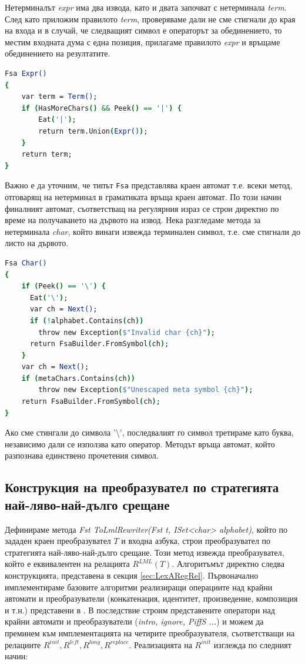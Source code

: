\documentclass[12pt, oneside]{article}
\theoremstyle{definition}
\begin{document}
Нетерминалът \emph{expr} има два извода, като и двата започват с нетерминала \emph{term}. След като приложим правилото \emph{term}, проверяваме дали не сме стигнали до края на входа и в случай, че следващият символ е операторът за обединението, то местим входната дума с една позиция, прилагаме правилото \emph{expr} и връщаме обединението на резултатите.

\begin{lstlisting}[language=csh]
Fsa Expr() 
{
    var term = Term();
    if (HasMoreChars() && Peek() == '|') {
        Eat('|');
        return term.Union(Expr());
    }
    return term;
}
\end{lstlisting}

Важно е да уточним, че типът \verb/Fsa/ представлява краен автомат т.е. всеки метод, отговарящ на нетерминал в граматиката връща краен автомат. По този начин финалният автомат, съответстващ на регулярния израз се строи директно по време на получаването на дървото на извод. Нека разгледаме метода за нетерминала \emph{char}, който винаги извежда терминален символ, т.е. сме стигнали до листо на дървото.

\begin{lstlisting}[language=csh]
Fsa Char() 
{
    if (Peek() == '\') {
      Eat('\');
      var ch = Next();
      if (!alphabet.Contains(ch))
        throw new Exception($"Invalid char {ch}");
      return FsaBuilder.FromSymbol(ch);
    }	
    var ch = Next();
    if (metaChars.Contains(ch))
        throw new Exception($"Unescaped meta symbol {ch}");
    return FsaBuilder.FromSymbol(ch);
}
\end{lstlisting}

Ако сме стингали до символа '\textbackslash', последвалият го символ третираме като буква, независимо дали се използва като оператор. Методът връща автомат, който разпознава единствено прочетения символ.

\subsection{Конструкция на преобразувател по стратегията най-ляво-най-дълго срещане}

Дефинираме метода \emph{Fst ToLmlRewriter(Fst t, ISet<char> alphabet)}, който по зададен краен преобразувател \(T\) и входна азбука, строи преобразувател по стратегията най-ляво-най-дълго срещане. Този метод извежда преобразувател, който е еквивалентен на релацията \( R^{LML}(T) \). Алгоритъмът директно следва конструкцията, представена в секция \ref{sec:LexARegRel}. Първоначално имплементираме базовите алгоритми реализиращи операциите над крайни автомати и преобразуватели (конкатенация, идентитет, произведение, композиция и т.н.) представени в \cite{Mihov:2018}. В последствие строим представените оператори над крайни автомати и преобразуватели (\emph{intro, ignore, PiffS ...}) и можем да преминем към имплементацията на четирите преобразувателя, съответстващи на релациите \( R^{init}, R^{left}, R^{long}, R^{replace} \). Реализацията на \( R^{init} \) изглежда по следният начин:
\end{document}

